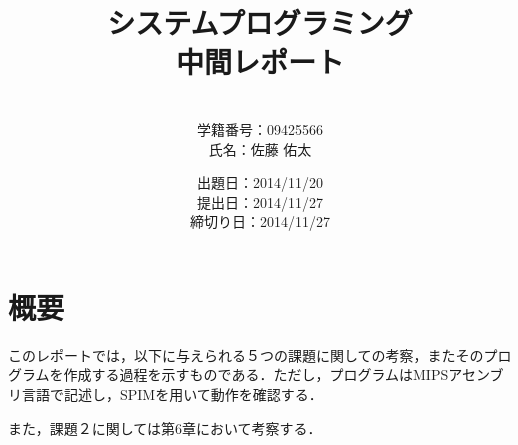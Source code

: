 \documentclass[a4j]{jarticle}
\title{システムプログラミング\\中間レポート}
\author{\\学籍番号：09425566\\氏名：佐藤 佑太}
\date{出題日：2014/11/20\\提出日：2014/11/27\\締切り日：2014/11/27\\}
\begin{document}
\maketitle

\newpage



%
%

\section{概要}

このレポートでは，以下に与えられる５つの課題に関しての考察，またそのプログラムを作成する過程を示すものである．ただし，プログラムはMIPSアセンブリ言語で記述し，SPIMを用いて動作を確認する．

また，課題２に関しては第6章において考察する．
\end{document}
